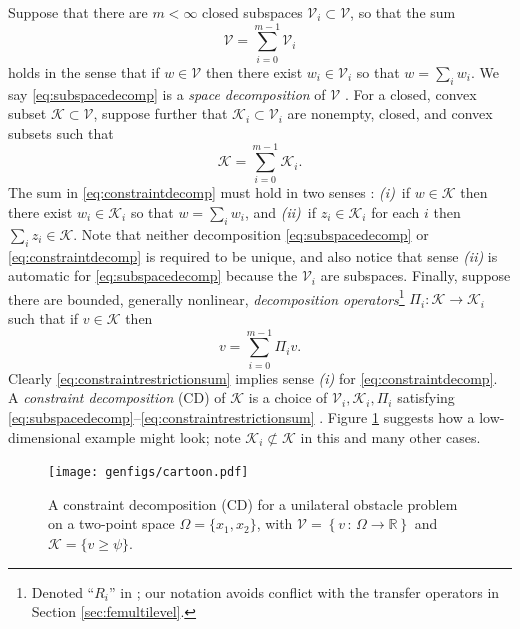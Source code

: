 \documentclass[review,hidelinks,onefignum,onetabnum]{siamart220329}
\newcommand{\RR}{\mathbb{R}}
\newcommand{\cK}{\mathcal{K}}
\newcommand{\cV}{\mathcal{V}}
\begin{document}
Suppose that there are $m<\infty$ closed subspaces $\cV_i \subset \cV$, so that the sum
\begin{equation}
\cV = \sum_{i=0}^{m-1} \cV_i \label{eq:subspacedecomp}
\end{equation}
holds in the sense that if $w \in \cV$ then there exist $w_i \in \cV_i$ so that $w = \sum_i w_i$.  We say \eqref{eq:subspacedecomp} is a \emph{space decomposition} of $\cV$ \cite{Xu1992}.  For a closed, convex subset $\cK \subset \cV$, suppose further that $\cK_i \subset \cV_i$ are nonempty, closed, and convex subsets such that
\begin{equation}
\cK = \sum_{i=0}^{m-1} \cK_i. \label{eq:constraintdecomp}
\end{equation}
The sum in \eqref{eq:constraintdecomp} must hold in two senses \cite{TaiTseng2002}: \emph{(i)}~if $w \in \cK$ then there exist $w_i \in \cK_i$ so that $w = \sum_i w_i$, and \emph{(ii)}~if $z_i \in \cK_i$ for each $i$ then $\sum_i z_i \in \cK$.  Note that neither decomposition \eqref{eq:subspacedecomp} or \eqref{eq:constraintdecomp} is required to be unique, and also notice that sense \emph{(ii)} is automatic for \eqref{eq:subspacedecomp} because the $\cV_i$ are subspaces.  Finally, suppose there are bounded, generally nonlinear, \emph{decomposition operators}\footnote{Denoted ``$R_i$'' in \cite{Tai2003}; our notation avoids conflict with the transfer operators in Section \ref{sec:femultilevel}.} $\Pi_i : \cK \to \cK_i$ such that if $v \in \cK$ then
\begin{equation}
v = \sum_{i=0}^{m-1} \Pi_i v.  \label{eq:constraintrestrictionsum}
\end{equation}
Clearly \eqref{eq:constraintrestrictionsum} implies sense \emph{(i)} for \eqref{eq:constraintdecomp}.  A \emph{constraint decomposition} (CD) of $\cK$ is a choice of $\cV_i,\cK_i,\Pi_i$ satisfying \eqref{eq:subspacedecomp}--\eqref{eq:constraintrestrictionsum} \cite{Tai2003}.  Figure \ref{fig:cartoon} suggests how a low-dimensional example might look; note $\cK_i \not\subset \cK$ in this and many other cases.

\begin{figure}[ht]
\centering
\texttt{[image: genfigs/cartoon.pdf]}
\caption{A constraint decomposition (CD) for a unilateral obstacle problem on a two-point space $\Omega=\{x_1,x_2\}$, with $\mathcal{V}=\left\{v \,:\, \Omega \to \RR\right\}$ and $\mathcal{K}=\{v\ge \psi\}$.}
\label{fig:cartoon}
\end{figure}
\end{document}
